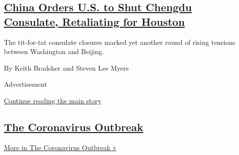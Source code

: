 \begin{enumerate}
  \hypertarget{china-orders-us-to-shut-chengdu-consulate-retaliating-for-houston}{%
  \subsection{\texorpdfstring{\href{/2020/07/24/world/asia/china-us-consulate-chengdu.html}{China
  Orders U.S. to Shut Chengdu Consulate, Retaliating for
  Houston}}{China Orders U.S. to Shut Chengdu Consulate, Retaliating for Houston}}\label{china-orders-us-to-shut-chengdu-consulate-retaliating-for-houston}}

  The tit-for-tat consulate closures marked yet another round of rising
  tensions between Washington and Beijing.

  By Keith Bradsher and Steven Lee Myers
\end{enumerate}

Advertisement

\protect\hyperlink{after-mid1}{Continue reading the main story}

\hypertarget{the-coronavirus-outbreak}{%
\subsection{\texorpdfstring{\href{/news-event/coronavirus}{The
Coronavirus
Outbreak}}{The Coronavirus Outbreak}}\label{the-coronavirus-outbreak}}

\href{/news-event/coronavirus}{More in The Coronavirus Outbreak »}

